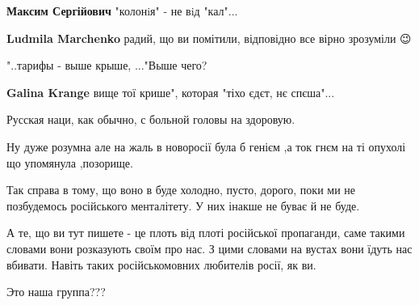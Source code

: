 \begin{itemize}
\begin{itemize}
\begin{itemize}
\textbf{Максим Сергійович} "колонiя" - не вiд "кал"...


\textbf{Ludmila Marchenko} радий, що ви помітили, відповідно все вірно зрозуміли 😉
\end{itemize}


"..тарифы - выше крыше, ..."\Laughey[1.0][white] Выше чего?

\begin{itemize}

\textbf{Galina Krange} вище тої крише", которая "тіхо єдєт, нє спєша"...
\end{itemize}


Русская наци, как обычно, с больной головы на здоровую.


Ну дуже розумна але на жаль в новоросії була б генієм ,а ток гнєм на ті опухолі що упомянула ,позорище.



Так справа в тому, що воно в буде холодно, пусто, дорого, поки ми не
позбудемось російського менталітету. У них інакше не буває й не буде.

А те, що ви тут пишете - це плоть від плоті російської пропаганди, саме такими
словами вони розказують своїм про нас. З цими словами на вустах вони їдуть нас
вбивати. Навіть таких російськомовних любителів росії, як ви.


Это наша группа???

\begin{itemize}


\end{itemize}
\end{itemize}
\end{itemize}
